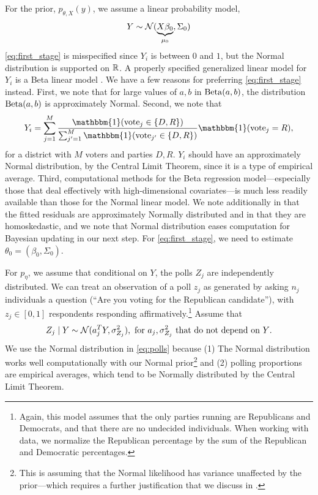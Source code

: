 \documentclass[12pt, letterpaper]{article}
\begin{document}
For the prior, $p_{\theta, X}(y)$, we assume a linear probability model,
\begin{equation}
    Y \sim \mathcal{N}(\underbrace{X\beta_0}_{\mu_0}, \Sigma_0)
    \label{eq:first_stage}
\end{equation}
\eqref{eq:first_stage} is misspecified since $Y_i$ is between $0$ and $1$, but the Normal
distribution is supported on $\mathbb{R}$. A properly specified generalized linear model
for $Y_i$ is a Beta linear model \citep[See][for an overview]{grun2011extended}.
We have a few reasons for preferring \eqref{eq:first_stage} instead. First, we
note that for large values of $a,b$ in $\operatorname{Beta}(a,b)$, the distribution
$\operatorname{Beta}(a,b)$ is approximately Normal. Second, we note that \[Y_i =
\sum_{j=1}^M \frac{\mathbbm{1} (\text{vote}_j \in \{D,R\})}{\sum_{j'=1}^M \mathbbm{1}
(\text{vote}_{j'} \in \{D,R\})} \mathbbm{1}(\text{vote}_j = R),\] for a district with
$M$ voters and parties $D,R$. $Y_i$ should have an approximately Normal distribution, by the
Central Limit Theorem, since it is a type of empirical average. Third, computational methods for the Beta regression
model---especially those that deal effectively with high-dimensional
covariates---is much less readily available than those for the Normal linear
model. We note additionally in  that the fitted residuals are
approximately Normally distributed and in  that they are homoskedastic, and we note that Normal distribution eases
computation for Bayesian updating in our next step. For \eqref{eq:first_stage},
we need to estimate $\theta_0 = (\beta_0, \Sigma_0)$. 

For $p_{\eta}$, we assume that conditional on $Y$, the polls $Z_j$ are
independently distributed. We can treat an observation of a poll $z_j$ as
generated by
asking $n_j$
individuals a question (``Are you voting for the Republican candidate''), with
$z_j \in [0,1]$ respondents responding
affirmatively.\footnote{Again, this model assumes that the only parties running
are Republicans and Democrats, and that there are no undecided individuals.
When working with data, we normalize the Republican percentage by the sum of
the Republican and Democratic percentages.}
Assume that 
\begin{equation}
    Z_j \mid Y \sim \mathcal{N}(a_j^T Y, \sigma_{Z_j}^2), \text{ for $a_j, \sigma_
    {Z_j}^2$ that do not depend on $Y$}.
    \label{eq:polls}
\end{equation}
We use the Normal distribution in \eqref{eq:polls} because (1) The Normal
distribution works well computationally with our Normal prior\footnote{This is
assuming that the Normal likelihood has variance unaffected by the
prior---which requires a further justification that we discuss in 
.} and (2) polling proportions are empirical averages, which
tend to be Normally distributed by the Central Limit Theorem.
\end{document}
